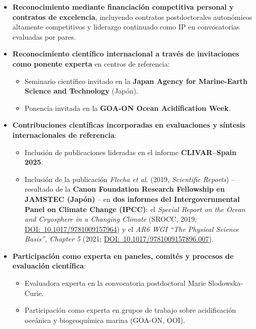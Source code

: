\documentclass[11pt,a4paper]{article}
\begin{document}
\begin{itemize}[leftmargin=*]

    \item \textbf{Reconocimiento mediante financiación competitiva personal y contratos de excelencia}, incluyendo contratos postdoctorales autonómicos altamente competitivos y liderazgo continuado como IP en convocatorias evaluadas por pares.

    \item \textbf{Reconocimiento científico internacional a través de invitaciones como ponente experta} en centros de referencia:
    \begin{itemize}
        \item Seminario científico invitado en la \textbf{Japan Agency for Marine-Earth Science and Technology} (Japón).
        \item Ponencia invitada en la  \textbf{GOA-ON Ocean Acidification Week}.
       
    \end{itemize}

    \item \textbf{Contribuciones científicas incorporadas en evaluaciones y síntesis internacionales de referencia}:
    \begin{itemize}
        \item Inclusión de publicaciones lideradas en el informe \textbf{CLIVAR--Spain 2025}.
        \item Inclusión de la publicación \textit{Flecha et al.} (2019, \textit{Scientific Reports}) -- resultado de la \textbf{Canon Foundation Research Fellowship en JAMSTEC (Japón)} -- en \textbf{dos informes del Intergovernmental Panel on Climate Change (IPCC)}: el \textit{Special Report on the Ocean and Cryosphere in a Changing Climate} (SROCC, 2019; \href{https://www.ipcc.ch/site/assets/uploads/sites/3/2022/03/SROCC_Ch05-SM_FINAL.pdf}{DOI:~10.1017/9781009157964}) y el \textit{AR6 WGI ``The Physical Science Basis'', Chapter 5} (2021; \href{https://www.ipcc.ch/report/ar6/wg1/downloads/report/IPCC_AR6_WGI_Chapter05_SM.pdf}{DOI:~10.1017/9781009157896.007}).
    \end{itemize}

    \item \textbf{Participación como experta en paneles, comités y procesos de evaluación científica}:
    \begin{itemize}
        \item Evaluadora experta en la convocatoria postdoctoral Marie Slodowska-Curie.
        \item Participación como experta en grupos de trabajo sobre acidificación oceánica y biogeoquímica marina (GOA-ON, OOI).
    \end{itemize}


\end{itemize}
\end{document}
